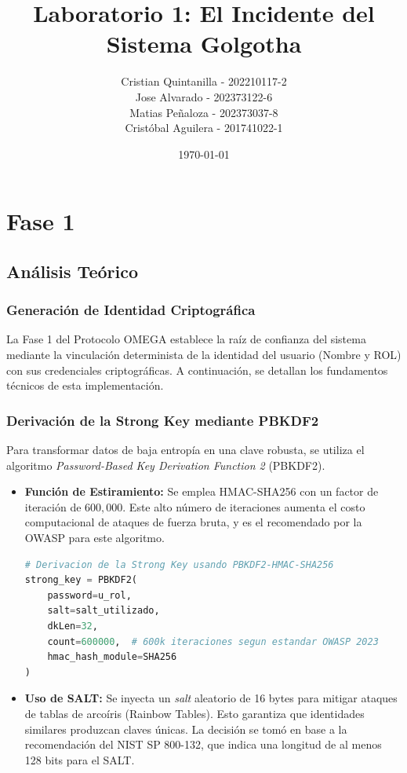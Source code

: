 \documentclass{article}
\title{Laboratorio 1: El Incidente del Sistema Golgotha}
\author{
    Cristian Quintanilla - 202210117-2 \\
    Jose Alvarado - 202373122-6 \\
    Matias Peñaloza - 202373037-8 \\
    Cristóbal Aguilera - 201741022-1
}
\date{\today}
\begin{document}
\maketitle

\section{Fase 1}
\subsection{Análisis Teórico}
\subsubsection{Generación de Identidad Criptográfica}

La Fase 1 del Protocolo OMEGA establece la raíz de confianza del sistema mediante la vinculación determinista de la identidad del usuario (Nombre y ROL) con sus credenciales criptográficas. A continuación, se detallan los fundamentos técnicos de esta implementación.

\subsubsection{Derivación de la Strong Key mediante PBKDF2}
Para transformar datos de baja entropía en una clave robusta, se utiliza el algoritmo \textit{Password-Based Key Derivation Function 2} (PBKDF2).

\begin{itemize}
    \item \textbf{Función de Estiramiento:} Se emplea HMAC-SHA256 con un factor de iteración de $600,000$. Este alto número de iteraciones aumenta el costo computacional de ataques de fuerza bruta, y es el recomendado por la OWASP para este algoritmo.

\begin{lstlisting}[language=Python, caption=Implementación de derivación de clave con estándar OWASP]
# Derivacion de la Strong Key usando PBKDF2-HMAC-SHA256
strong_key = PBKDF2(
    password=u_rol,
    salt=salt_utilizado,
    dkLen=32,
    count=600000,  # 600k iteraciones segun estandar OWASP 2023
    hmac_hash_module=SHA256
)
\end{lstlisting}

    \item \textbf{Uso de SALT:} Se inyecta un \textit{salt} aleatorio de 16 bytes para mitigar ataques de tablas de arcoíris (Rainbow Tables). Esto garantiza que identidades similares produzcan claves únicas.
    La decisión se tomó en base a la recomendación del NIST SP 800-132, que indica una longitud de al menos 128 bits para el SALT.
\end{itemize}
\end{document}
